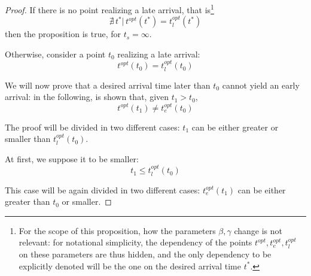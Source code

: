 \begin{proof}
  
  
  If there is no point realizing a late arrival, that is\footnote{For the scope of this proposition, how the parameters \(\beta, \gamma\) change is not relevant:
  for notational simplicity, the dependency of the points \(t^{opt}, t_e^{opt}, t_l^{opt}\) on these parameters are thus hidden,
  and the only dependency to be explicitly denoted will be the one on the desired arrival time \(t^*\).}
  \begin{equation*}
    \nexists\, t^* |\, t^{opt}(t^*) = t_l^{opt}(t^*)
  \end{equation*}
  then the proposition is true, for \(t_s = \infty\).

  Otherwise, consider a point \(t_0\) realizing a late arrival:
  \begin{equation*}
    t^{opt}(t_0) = t_l^{opt}(t_0)
  \end{equation*}

  We will now prove that a desired arrival time later than \(t_0\) cannot yield an early arrival:
  in the following, is shown that, given \(t_1 > t_0\),
  \begin{equation*}
    t^{opt}(t_1) \neq t_e^{opt}(t_0)
  \end{equation*}

  The proof will be divided in two different cases:
  \(t_1\) can be either greater or smaller than \(t_l^{opt}(t_0)\).

  At first, we suppose it to be smaller: \[t_1 \leq t_l^{opt}(t_0)\]

  This case will be again divided in two different cases:
  \(t_e^{opt}(t_1)\) can be either greater than \(t_0\) or smaller.


\end{proof}
